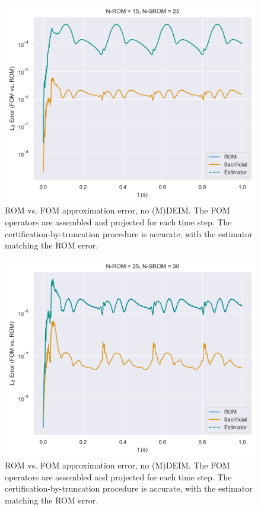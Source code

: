 \documentclass[../../thesis.tex]{subfiles}
\begin{document}

\begin{figure}[h]
    \includegraphics[width =\columnwidth]{research_project/piston/figures/nonlinear_displacement/truncation_error/no_deim/error_estimation_rom_15_srom_25_0.png}
    \caption{ROM vs. FOM approximation error, no (M)DEIM.
    The FOM operators are assembled and projected for each time step.
    The certification-by-truncation procedure is accurate, with the estimator matching the ROM error.}
    \label{fig:nlinear_disp_no_deim_errors_above_threshold}
\end{figure}

\begin{figure}[h]
    \includegraphics[width =\columnwidth]{research_project/piston/figures/nonlinear_displacement/truncation_error/no_deim/error_estimation_rom_25_srom_30_0.png}
    \caption{ROM vs. FOM approximation error, no (M)DEIM.
    The FOM operators are assembled and projected for each time step.
    The certification-by-truncation procedure is accurate, with the estimator matching the ROM error.}
    \label{fig:nlinear_disp_no_deim_errors_below_threshold}
\end{figure}
\end{document}
